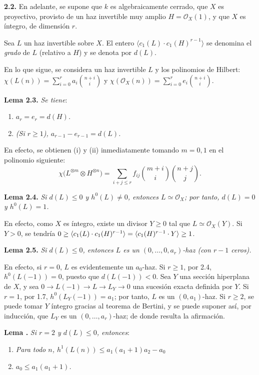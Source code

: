 \textbf{2.2.} En adelante, se supone que \(k\) es algebraicamente cerrado,
que \(X\) es proyectivo, provisto de un haz invertible muy amplio
\(H=\mathcal O_X(1)\), y que \(X\) es íntegro, de dimensión \(r\).

Sea \(L\) un haz invertible sobre \(X\). El entero
\(\langle c_1(L)\cdot c_1(H)^{r-1}\rangle\) se denomina el \emph{grado} de
\(L\) (relativo a \(H\)) y se denota por \(d(L)\).

En lo que sigue, se considera un haz invertible \(L\) y los polinomios de
Hilbert: \(\chi(L(n))=\sum_{i=0}^{r}a_i\binom{n+i}{i}\) y
\(\chi(\mathcal O_X(n))=\sum_{i=0}^{r}e_i\binom{n+i}{i}\).

\textbf{Lema 2.3.} \emph{Se tiene}:
\begin{enumerate}[label=(\roman*)]
\item \emph{\(a_r=e_r=d(H)\).}
\item \emph{(Si \(r\ge1\)), \(a_{r-1}-e_{r-1}=d(L)\).}
\end{enumerate}

En efecto, se obtienen (i) y (ii) inmediatamente tomando \(m=0,1\) en el
polinomio siguiente:
\[
\chi\bigl(L^{\otimes m}\otimes H^{\otimes n}\bigr)
=
\sum_{i+j\le r} f_{ij}\binom{m+i}{i}\binom{n+j}{j}.
\]

\textbf{Lema 2.4.} \emph{Si \(d(L)\le0\) y \(h^0(L)\ne0\), entonces
\(L\simeq\mathcal O_X\); por tanto, \(d(L)=0\) y \(h^0(L)=1\).}

En efecto, como \(X\) es íntegro, existe un divisor \(Y\ge0\) tal que
\(L\simeq\mathcal O_X(Y)\). Si \(Y>0\), se tendría
\(0\ge\langle \sisi{c(L)}{c_1(L)}\cdot c_1(H)^{r-1}\rangle=\langle c_1(H)^{r-1}\cdot Y\rangle\ge1\). %

\textbf{Lema 2.5.} \emph{Si \(d(L)\le0\), entonces \(L\) es un
\((0,\ldots,0,a_r)\)-haz (con \(r-1\) ceros).}

En efecto, si \(r=0\), \(L\) es evidentemente un \(a_0\)-haz. Si \(r\ge1\),
por 2.4, \(h^0(L(-1))=0\), puesto que \(d(L(-1))<0\). Sea \(Y\) una sección
hiperplana de \(X\), y sea
\(0\longrightarrow L(-1)\longrightarrow L\longrightarrow L_Y\longrightarrow0\)
una sucesión exacta definida por \(Y\). Si \(r=1\), por 1.7,
\(h^0(L_Y(-1))=a_1\); por tanto, \(L\) es un \((0,a_1)\)-haz. Si \(r\ge2\),
se puede tomar \(Y\) íntegro gracias al teorema de Bertini, y se puede
suponer así, por inducción, que \(L_Y\) es un
\((0,\ldots,a_r)\)-haz; de donde resulta la afirmación.

\textbf{Lema .} \emph{Si \(r=2\) y \(d(L)\le0\), entonces}: %
\begin{enumerate}[label=(\roman*)]
\item \emph{Para todo \(n\), \(h^1(L(n))\le a_1(a_1+1)a_2-a_0\)}
\item \emph{\(a_0\le a_1(a_1+1)\).}
\end{enumerate}


